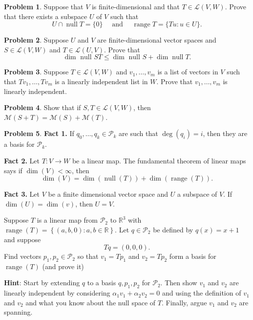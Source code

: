 \documentclass[12pt]{article}
\theoremstyle{definition}
\newtheorem{problem}{Problem}
\newcommand{\range}{\operatorname{range}}
\renewcommand{\null}{\operatorname{null}}
\begin{document}
\begin{problem}
    Suppose that $V$ is finite-dimensional and that $T \in \mathcal{L}(V, W)$. Prove that there exists a subspace $U$ of $V$ such that
    \[
    U \cap \operatorname{null} T=\{0\} \quad \text { and } \quad \operatorname{range} T=\{T u: u \in U\} .
    \]
\end{problem}

\begin{problem}
    Suppose $U$ and $V$ are finite-dimensional vector spaces and $S \in \mathcal{L}(V, W)$ and $T \in \mathcal{L}(U, V)$. Prove that
\[
\operatorname{dim} \text { null } S T \leq \operatorname{dim} \text { null } S+\operatorname{dim} \operatorname{null} T .
\]
\end{problem}

\begin{problem}
    Suppose $T \in \mathcal{L}(V, W)$ and $v_1, \ldots, v_m$ is a list of vectors in $V$ such that $T v_1, \ldots, T v_m$ is a linearly independent list in $W$. Prove that $v_1, \ldots, v_m$ is linearly independent.
\end{problem}

\begin{problem}
    Show that if $S, T \in \mathcal{L}(V, W)$, then $\mathcal{M}(S+T)=\mathcal{M}(S)+\mathcal{M}(T)$.
\end{problem}

\begin{problem}

\textbf{Fact 1.} If $q_0, \ldots, q_k\in\mathcal{P}_k$ are such that $\deg(q_i) = i$, then they are a basis for $\mathcal{P}_k$.

\textbf{Fact 2.} Let $T:V\to W$ be a linear map. The fundamental theorem of linear maps says if $\dim(V)<\infty$, then
\[
    \dim(V) = \dim(\null(T)) + \dim(\range(T)).
\]

\textbf{Fact 3.} Let $V$ be a finite dimensional vector space and $U$ a subspace of $V$. If $\dim(U) = \dim(v)$, then $U = V$.

    Suppose $T$ is a linear map from $\mathcal{P}_2$ to $\mathbb{R}^3$ with $\range(T) = \left\{ (a,b,0) : a,b\in \mathbb{R} \right\}$.
    Let $q\in\mathcal{P}_2$ be defined by $q(x) = x+1$ and suppose 
    \[
        T q = (0,0,0)
        .
    \]
    Find vectors $p_1,p_2\in\mathcal{P}_2$ so that $v_1 = Tp_1$ and $v_2 = Tp_2$ form a basis for $\range(T)$ (and prove it)

    \textbf{Hint}: Start by extending $q$ to a basis $q,p_1,p_2$ for $\mathcal{P}_2$. Then show $v_1$ and $v_2$ are linearly independent by considering $\alpha_1 v_1 + \alpha_2 v_2 = 0$ and using the definition of $v_1$ and $v_2$ and what you know about the null space of $T$. Finally, argue $v_1$ and $v_2$ are spanning.

\end{problem}
\end{document}
